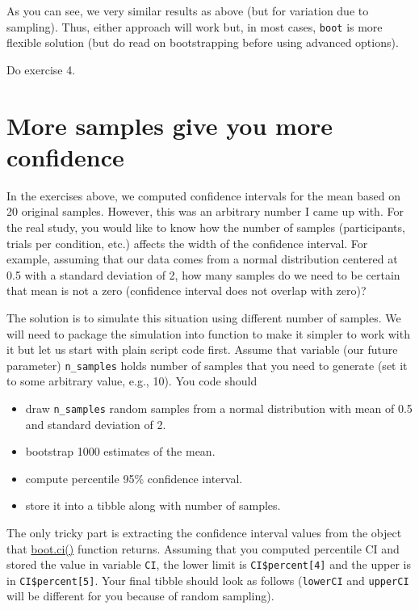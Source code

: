 \documentclass[
]{book}
\providecommand{\tightlist}{%
  \setlength{\itemsep}{0pt}\setlength{\parskip}{0pt}}
\begin{document}
As you can see, we very similar results as above (but for variation due to sampling). Thus, either approach will work but, in most cases, \texttt{boot} is more flexible solution (but do read on bootstrapping before using advanced options).

Do exercise 4.

\hypertarget{more-samples-give-you-more-confidence}{%
\section{More samples give you more confidence}\label{more-samples-give-you-more-confidence}}

In the exercises above, we computed confidence intervals for the mean based on 20 original samples. However, this was an arbitrary number I came up with. For the real study, you would like to know how the number of samples (participants, trials per condition, etc.) affects the width of the confidence interval. For example, assuming that our data comes from a normal distribution centered at 0.5 with a standard deviation of 2, how many samples do we need to be certain that mean is not a zero (confidence interval does not overlap with zero)?

The solution is to simulate this situation using different number of samples. We will need to package the simulation into function to make it simpler to work with it but let us start with plain script code first. Assume that variable (our future parameter) \texttt{n\_samples} holds number of samples that you need to generate (set it to some arbitrary value, e.g., 10). You code should

\begin{itemize}
\tightlist
\item
  draw \texttt{n\_samples} random samples from a normal distribution with mean of 0.5 and standard deviation of 2.
\item
  bootstrap 1000 estimates of the mean.
\item
  compute percentile 95\% confidence interval.
\item
  store it into a tibble along with number of samples.
\end{itemize}

The only tricky part is extracting the confidence interval values from the object that \href{https://stat.ethz.ch/R-manual/R-devel/library/boot/html/boot.html}{boot.ci()} function returns. Assuming that you computed percentile CI and stored the value in variable \texttt{CI}, the lower limit is \texttt{CI\$percent{[}4{]}} and the upper is in \texttt{CI\$percent{[}5{]}}. Your final tibble should look as follows (\texttt{lowerCI} and \texttt{upperCI} will be different for you because of random sampling).
\end{document}
